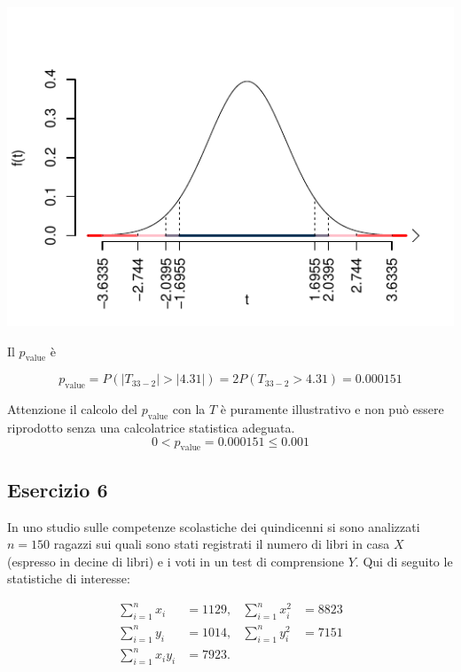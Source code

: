 \documentclass[
  11pt,
]{book}
\theoremstyle{mytheoremstyle}
\theoremstyle{mydefstyle}
\newenvironment{sol}
  {
  \begin{tcolorbox}[enhanced,breakable,arc=0.1mm,boxrule=1pt,colback=white,colframe=iblue,
  title=\bf \fontfamily{lmss}\selectfont \hspace{.5 cm} Soluzione,drop fuzzy shadow]

}{
\end{tcolorbox}
  }
\begin{document}
\begin{sol}
\begin{center}\includegraphics{Esami_passati_con_soluzioni_files/figure-latex/2021-11,-1} \end{center}

Il \(p_{\text{value}}\) è

\[ p_{\text{value}} = P(|T_{33-2}|>|4.31|)=2P(T_{33-2}>4.31)=0.000151 \]

Attenzione il calcolo del \(p_\text{value}\) con la \(T\) è puramente illustrativo e non può essere riprodotto senza una calcolatrice statistica adeguata.\[
 0 < p_\text{value}= 0.000151 \leq 0.001 
\]

\end{sol}

\subsection{Esercizio 6}\label{esercizio-6-2}

In uno studio sulle competenze scolastiche dei quindicenni si sono analizzati \(n=150\) ragazzi sui quali sono stati registrati il numero di libri in casa \(X\) (espresso in decine di libri) e i voti in un test di comprensione \(Y\). Qui di seguito le statistiche di interesse:

\begin{align*}
\sum_{i=1}^n x_i &= 1129,   &\sum_{i=1}^n x_i^2 &= 8823 \\
\sum_{i=1}^n y_i &= 1014,   &\sum_{i=1}^n y_i^2 &= 7151 \\
\sum_{i=1}^n x_iy_i &= 7923.    \\
\end{align*}
\end{document}

